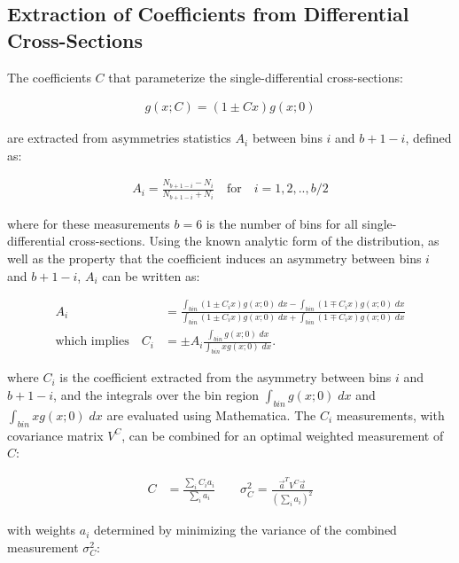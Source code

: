 \begin{refsection}
\section{Extraction of Coefficients from Differential Cross-Sections}
\label{coefficient_extraction}
The coefficients $C$ that parameterize the single-differential cross-sections: 
\begin{linenomath*}
\begin{align}
g(x;C) = (1 \pm Cx)g(x;0)
\end{align}
\end{linenomath*}
are extracted from asymmetries statistics $A_i$ between bins $i$ and $b+1-i$, defined as:
\begin{linenomath*}
\begin{align}
A_i = \frac{N_{b+1-i} - N_i}{N_{b+1-i} + N_i} \quad \text{for} \quad i = 1,2,..,b/2
\end{align}
\end{linenomath*}
where for these measurements $b=6$ is the number of bins for all single-differential cross-sections.
Using the known analytic form of the distribution, as well as the property that the coefficient induces an asymmetry between bins $i$ and $b+1-i$, $A_i$ can be written as:
\begin{linenomath*}
\begin{align}
A_i &= \frac{\int_{bin} (1 \pm C_i x)g(x;0) \; dx  - \int_{bin} (1 \mp C_i x)g(x;0) \; dx}{\int_{bin} (1 \pm C_i x)g(x;0) \; dx  + \int_{bin} (1 \mp C_i x)g(x;0) \; dx} \\
\text{which implies} \quad C_i &= \pm A_i  \frac{\int_{bin} g(x;0) \; dx}{\int_{bin} x g(x;0) \; dx}.
\end{align}
\end{linenomath*}
where $C_i$ is the coefficient extracted from the asymmetry between bins $i$ and $b+1-i$, and the integrals over the bin region $\int_{bin} g(x;0) \; dx$ and $\int_{bin} x g(x;0) \; dx$ are evaluated using Mathematica.
The $C_i$ measurements, with covariance matrix $V^C$, can be combined for an optimal weighted measurement of $C$:
\begin{linenomath*}
\begin{align*}
C &= \frac{\sum_i C_i a_i}{\sum_i a_i} \quad \quad \sigma^2_C = \frac{\vec{a}^T V^C \vec{a}}{\left( \sum_i a_i \right)^2}
\end{align*}
\end{linenomath*}
with weights $a_i$ determined by minimizing the variance of the combined measurement $\sigma^2_C$:
\begin{linenomath*}

\end{linenomath*}
\end{refsection}
